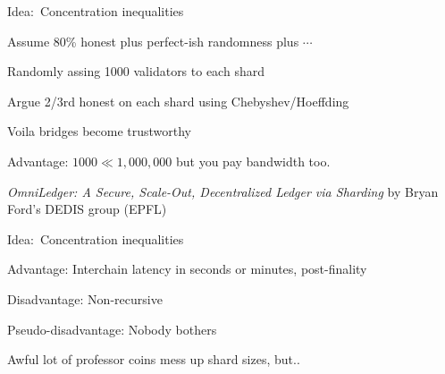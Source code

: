 \documentclass{beamer}
\begin{document}
\begin{frame}

Idea:\  Concentration inequalities \\ \bigskip\bigskip

Assume 80\% honest plus perfect-ish randomness plus $\cdots$  \\ \medskip

Randomly assing 1000 validators to each shard \\ \medskip

Argue 2/3rd honest on each shard using Chebyshev/Hoeffding \\ \medskip

\hspace{5pt} Voila bridges become trustworthy 

\bigskip\bigskip

Advantage:  $1000 \ll 1,000,000$ but you pay bandwidth too.

\bigskip\bigskip

{\em OmniLedger: A Secure, Scale-Out, Decentralized Ledger via Sharding} by Bryan Ford's DEDIS group (EPFL)

\end{frame}



\begin{frame}

Idea:\  Concentration inequalities \\ \bigskip\bigskip

Advantage:  Interchain latency in seconds or minutes, post-finality \\ \bigskip\bigskip

Disadvantage: Non-recursive \\ \bigskip\bigskip

\pause

Pseudo-disadvantage: Nobody bothers \\ \medskip

\hspace{5pt} Awful lot of professor coins mess up shard sizes, but.. 

\end{frame}
\end{document}
